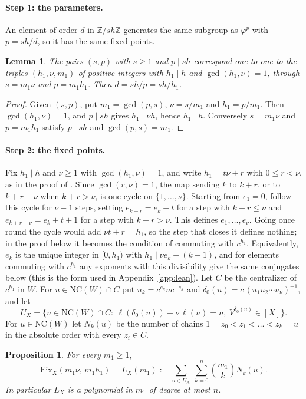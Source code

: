 \documentclass[11pt]{article}
\newtheorem{proposition}[theorem]{Proposition}
\newtheorem{lemma}[theorem]{Lemma}
\theoremstyle{definition}
\newcommand{\NC}{\mathrm{NC}}
\newcommand{\Fix}{\mathrm{Fix}}
\newcommand{\Z}{\mathbb{Z}}
\begin{document}
\paragraph{Step 1: the parameters.}
An element of order $d$ in $\Z/sh\Z$ generates the same subgroup as
$\varphi^p$ with $p=sh/d$, so it has the same fixed points.

\begin{lemma}\label{lem:param}
The pairs $(s,p)$ with $s\ge1$ and $p\mid sh$ correspond one to one to
the triples $(h_1,\nu,m_1)$ of positive integers with $h_1\mid h$ and
$\gcd(h_1,\nu)=1$, through $s=m_1\nu$ and $p=m_1h_1$. Then $d=sh/p=\nu h/h_1$.
\end{lemma}

\begin{proof}
Given $(s,p)$, put $m_1=\gcd(p,s)$, $\nu=s/m_1$ and $h_1=p/m_1$. Then
$\gcd(h_1,\nu)=1$, and $p\mid sh$ gives $h_1\mid \nu h$, hence $h_1\mid h$.
Conversely $s=m_1\nu$ and $p=m_1h_1$ satisfy $p\mid sh$ and
$\gcd(p,s)=m_1$.
\end{proof}

\paragraph{Step 2: the fixed points.}
Fix $h_1\mid h$ and $\nu\ge1$ with $\gcd(h_1,\nu)=1$, and write
$h_1=t\nu+r$ with $0\le r<\nu$, as in the proof of \cite[Lemma~30]{KM}.
Since $\gcd(r,\nu)=1$, the map sending $k$ to $k+r$, or to $k+r-\nu$ when
$k+r>\nu$, is one cycle on $\{1,\dots,\nu\}$. Starting from $e_1=0$, follow
this cycle for $\nu-1$ steps, setting $e_{k+r}=e_k+t$ for a step with
$k+r\le\nu$ and $e_{k+r-\nu}=e_k+t+1$ for a step with $k+r>\nu$. This
defines $e_1,\dots,e_\nu$. Going once round the cycle would add
$\nu t+r=h_1$, so the step that closes it defines nothing; in the proof
below it becomes the condition of commuting with $c^{h_1}$. Equivalently,
$e_k$ is the unique integer in $[0,h_1)$ with $h_1\mid \nu e_k+(k-1)$, and
for elements commuting with $c^{h_1}$ any exponents with this divisibility
give the same conjugates below (this is the form used in
Appendix~\ref{app:lean}). Let $C$ be the centralizer of $c^{h_1}$ in
$W$. For $u\in\NC(W)\cap C$ put $u_k=c^{e_k}uc^{-e_k}$ and
$\delta_0(u)=c\,(u_1u_2\cdots u_{\nu})^{-1}$, and let
\[
U_X=\{u\in\NC(W)\cap C:\ \ell(\delta_0(u))+\nu\,\ell(u)=n,\ V^{\delta_0(u)}\in[X]\}.
\]
For $u\in\NC(W)$ let $N_k(u)$ be the number of chains
$1=z_0<z_1<\dots<z_k=u$ in the absolute order with every $z_i\in C$.

\begin{proposition}\label{prop:fix}
For every $m_1\ge1$,
\[
\Fix_X(m_1\nu,\,m_1h_1)=L_X(m_1):=\sum_{u\in U_X}\ \sum_{k=0}^{n}\binom{m_1}{k}N_k(u).
\]
In particular $L_X$ is a polynomial in $m_1$ of degree at most $n$.
\end{proposition}
\end{document}
